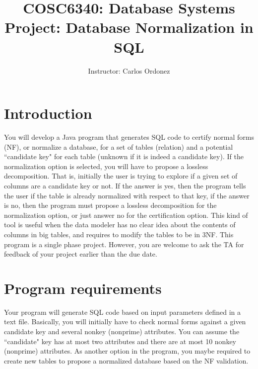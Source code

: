 
\title{COSC6340: Database Systems\\
Project: Database Normalization in SQL
}

\author{Instructor: Carlos Ordonez}
\date{}



\maketitle

\section{Introduction}
%
You will develop a Java program that generates SQL code to certify normal forms (NF), or normalize
a database, for a set of tables
(relation) and a potential ``candidate key" for each table (unknown if it is indeed a candidate key). If the normalization option is selected, you will have to propose a lossless decomposition. That is, initially the user is
trying to explore if a given set of columns are a candidate key or not.
If the answer is yes, then the program
tells the user if the table is already normalized with respect to that key, if the answer is no, then the program must propose a lossless decomposition for the normalization option, or just answer no for the certification option. This kind of tool is useful when the data
modeler has no clear idea about the contents of columns in big tables, and requires to modify the tables
to be in 3NF.
This program is a single phase project. However, you are welcome to ask the TA for feedback of your project earlier than the due date.

\section{Program requirements}

Your program will generate SQL code based on input parameters defined in a text file. Basically, you will initially have to check normal
forms against a given candidate key and several nonkey (nonprime) attributes. You can assume the
``candidate" key has at most two attributes and there are at most 10 nonkey (nonprime) attributes.
As another option in the program, you maybe required to create new tables to propose a
normalized database based on the NF validation.


